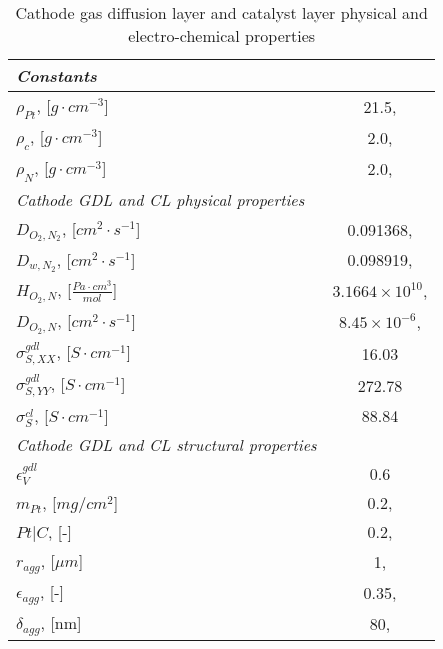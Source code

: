 \documentclass[]{elsart}
\begin{document}
\begin{table}[ptb]\begin{center}
 \caption{Cathode gas diffusion layer and catalyst layer physical and electro-chemical properties}
 \label{tb:data_cathode}
 \begin{tabular}{lc}  \hline \hline
	\it{Constants} \\ \hline
	$\rho_{Pt}$, [$g\cdot cm^{-3}$]                & 21.5, \cite{Song04}                            \\
	$\rho_{c}$, [$g\cdot cm^{-3}$]                  & 2.0, \cite{Song04}                               \\
	$\rho_{N}$, [$g\cdot cm^{-3}$]                 & 2.0, \cite{Song04}                             \\
	\it{Cathode GDL and CL physical properties} \\ \hline
	$D_{O_2,N_2}$,  [$cm^2\cdot s^{-1}$]     &0.091368, \cite{cussler97}    \\         
	$D_{w,N_2}$,  [$cm^2\cdot s^{-1}$]         &0.098919, \cite{cussler97}      \\
	$H_{O_2,N}$,  [$\frac{Pa \cdot cm^3}{mol}$]  & $3.1664 \times 10^{10}$,  \cite{Sun05}      \\
	$D_{O_2, N}$, [$cm^2\cdot s^{-1}$]         & $8.45\times10^{-6}$, \cite{Sun05} \\
    	$\sigma^{gdl}_{S,XX}$, [$S\cdot cm^{-1}$]     &16.03			                   \\
	$\sigma^{gdl}_{S,YY}$, [$S\cdot cm^{-1}$]     &272.78  \\	
	$\sigma^{cl}_S$, [$S\cdot cm^{-1}$]               & 88.84  \\	
	\it{Cathode GDL and CL structural properties} \\ \hline
	$\epsilon_V^{gdl}$                                     & 0.6 \\
    	$m_{Pt}$, [$mg/cm^2$]                             & 0.2, \cite{Bender03}                             \\
	$Pt|C$, [-]                                                   & 0.2, \cite{Bender03}          \\
    	$r_{agg}$, [$\mu m$]                                 & 1, \cite{Sun05}                                   \\
	$\epsilon_{agg}$, [-]                                   & 0.35, \cite{Sun05}             \\
	$\delta_{agg}$, [nm]                                   & 80, \cite{Sun05,Lee98}  \\

\end{tabular}
\end{center}
\end{table}
\end{document}
